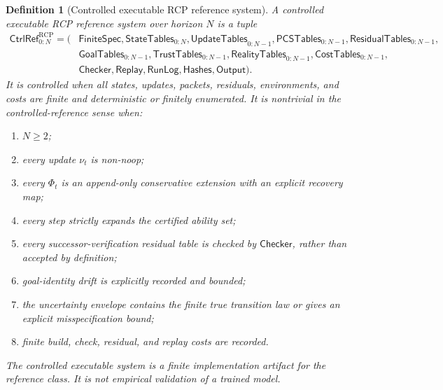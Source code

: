 \documentclass[11pt]{article}
\newtheorem{definition}[theorem]{Definition}
\newcommand{\1}{\mathbf{1}}
\newcommand{\RCP}{\mathrm{RCP}}
\begin{document}
\begin{definition}[Controlled executable RCP reference system]
\label{def:batch13rb_controlled_executable_reference_system}
A controlled executable RCP reference system over horizon \(N\) is a tuple
\[
\begin{aligned}
\mathsf{CtrlRef}_{0:N}^{\RCP}=(&\mathsf{FiniteSpec},\mathsf{StateTables}_{0:N},\mathsf{UpdateTables}_{0:N-1},
\mathsf{PCSTables}_{0:N-1},\mathsf{ResidualTables}_{0:N-1},\\
&\mathsf{GoalTables}_{0:N-1},\mathsf{TrustTables}_{0:N-1},\mathsf{RealityTables}_{0:N-1},
\mathsf{CostTables}_{0:N-1},\\
&\mathsf{Checker},\mathsf{Replay},\mathsf{RunLog},\mathsf{Hashes},\mathsf{Output}).
\end{aligned}
\]
It is controlled when all states, updates, packets, residuals, environments, and costs are finite and deterministic or finitely enumerated.  It is nontrivial in the controlled-reference sense when:
\begin{enumerate}[label=(\roman*),leftmargin=1.5em]
    \item \(N\ge2\);
    \item every update \(\nu_t\) is non-noop;
    \item every \(\Phi_t\) is an append-only conservative extension with an explicit recovery map;
    \item every step strictly expands the certified ability set;
    \item every successor-verification residual table is checked by \(\mathsf{Checker}\), rather than accepted by definition;
    \item goal-identity drift is explicitly recorded and bounded;
    \item the uncertainty envelope contains the finite true transition law or gives an explicit misspecification bound;
    \item finite build, check, residual, and replay costs are recorded.
\end{enumerate}
The controlled executable system is a finite implementation artifact for the reference class.  It is not empirical validation of a trained model.
\end{definition}
\end{document}
